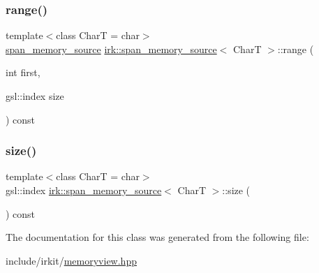 \mbox{\label{classirk_1_1span__memory__source_a26a51966eb90329da22ef03066787f58}} 
\subsubsection{\texorpdfstring{range()}{range()}}
{\footnotesize\ttfamily template$<$class CharT  = char$>$ \\
\mbox{\hyperlink{classirk_1_1span__memory__source}{span\+\_\+memory\+\_\+source}} \mbox{\hyperlink{classirk_1_1span__memory__source}{irk\+::span\+\_\+memory\+\_\+source}}$<$ CharT $>$\+::range (\begin{DoxyParamCaption}\item[{int}]{first,  }\item[{gsl\+::index}]{size }\end{DoxyParamCaption}) const\hspace{0.3cm}{\ttfamily [inline]}}

\mbox{\label{classirk_1_1span__memory__source_a91975691d661bddcd60f8f57c6275297}} 
\subsubsection{\texorpdfstring{size()}{size()}}
{\footnotesize\ttfamily template$<$class CharT  = char$>$ \\
gsl\+::index \mbox{\hyperlink{classirk_1_1span__memory__source}{irk\+::span\+\_\+memory\+\_\+source}}$<$ CharT $>$\+::size (\begin{DoxyParamCaption}{ }\end{DoxyParamCaption}) const\hspace{0.3cm}{\ttfamily [inline]}}



The documentation for this class was generated from the following file\+:\begin{DoxyCompactItemize}
\item 
include/irkit/\mbox{\hyperlink{memoryview_8hpp}{memoryview.\+hpp}}\end{DoxyCompactItemize}
